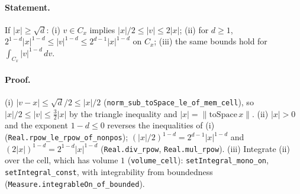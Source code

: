 \paragraph{Statement.} If $|x|\ge\sqrt d$: (i) $v\in C_x$ implies $|x|/2\le|v|\le2|x|$; (ii) for
$d\ge1$, $2^{1-d}|x|^{1-d}\le|v|^{1-d}\le2^{d-1}|x|^{1-d}$ on $C_x$; (iii) the same bounds hold for
$\int_{C_x}|v|^{1-d}\,dv$.
\paragraph{Proof.} (i) $|v-x|\le\sqrt d/2\le|x|/2$ (\texttt{norm\_sub\_toSpace\_le\_of\_mem\_cell}),
so $|x|/2\le|v|\le\frac32|x|$ by the triangle inequality and $|x|=\|\mathrm{toSpace}\,x\|$. (ii)
$|x|>0$ and the exponent $1-d\le0$ reverses the inequalities of (i)
(\texttt{Real.rpow\_le\_rpow\_of\_nonpos}); $(|x|/2)^{1-d}=2^{d-1}|x|^{1-d}$ and
$(2|x|)^{1-d}=2^{1-d}|x|^{1-d}$ (\texttt{Real.div\_rpow}, \texttt{Real.mul\_rpow}). (iii) Integrate
(ii) over the cell, which has volume $1$ (\texttt{volume\_cell}): \texttt{setIntegral\_mono\_on},
\texttt{setIntegral\_const}, with integrability from boundedness
(\texttt{Measure.integrableOn\_of\_bounded}).
